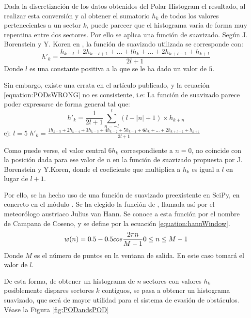 Dada la discretización de los datos obtenidos del Polar Histogram el resultado, al realizar esta conversión y al obtener el sumatorio $h_k$ de todos los valores pertenecientes a un sector $k$, puede parecer que el histograma varía de forma muy repentina entre dos sectores. Por ello se aplica una función de suavizado. 
Según J. Borenstein y Y. Koren en \citep{art:BorensteinKorenVFH}, la función de suavizado utilizada se corresponde con: 
\begin{equation}
\label{equation:PODsWRONG}
h'_k = \frac{h_{k-l} +2h_{k-l+1} + ... + lh_k + ... + 2h_{k+l-1} + h_{k+l}}{2l+1}
\end{equation}
Donde $l$  es una constante positiva a la que se le ha dado un valor de $5$. 

Sin embargo, existe una errata en el artículo publicado, y la ecuación \ref{equation:PODsWRONG} no es consistente, i.e:
La función de suavizado parece poder expresarse de forma general tal que:
\begin{equation}
\label{equation:PODsWRONGgen}
h'_k =\frac{1}{2l+1} \sum_{n=-l}^{l} (l-  |n| +1) \times h_{k+n}
\end{equation}
ej: $l = 5$ $ h'_k = \frac{1h_{k-5} +2h_{k-4} + 3h_{k-3} + 4h_{k-2} + 5h_{k-1} + \textbf{6}h_k + ... + 2h_{k+l-1} + h_{k+l}}{2l+1} $

Como puede verse, el valor central $ 6h_k $ correspondiente a $n=0$, no coincide con la posición dada para ese valor de $n$ en la función de suavizado propuesta por J. Borenstein y Y.Koren, donde el coeficiente que multiplica a $h_k$ es igual a $l$ en lugar de $l+1$.

Por ello, se ha hecho uso de una función de suavizado preexistente en SciPy, en concreto en el módulo . Se ha elegido la función de , llamada así por el meteorólogo austriaco Julius van Hann. Se conoce a esta función por el nombre de Campana de Coseno, y se define por la ecuación \ref{equation:hannWindow}.
\begin{equation}
\label{equation:hannWindow}
w(n)=0.5 - 0.5 cos\frac{2 \pi n}{M-1}\\
0 \leq n \leq M-1
\end{equation}
Donde $M$ es el número de puntos en la ventana de salida. En este caso tomará el valor de $l$.

De esta forma, de obtener un histograma de $n$ sectores con valores $h_k$ posiblemente dispares sectores $k$ contiguos, se pasa a obtener un histograma suavizado, que será de mayor utilidad para el sistema de evasión de obstáculos. Véase la Figura \ref{fig:PODandsPOD}

